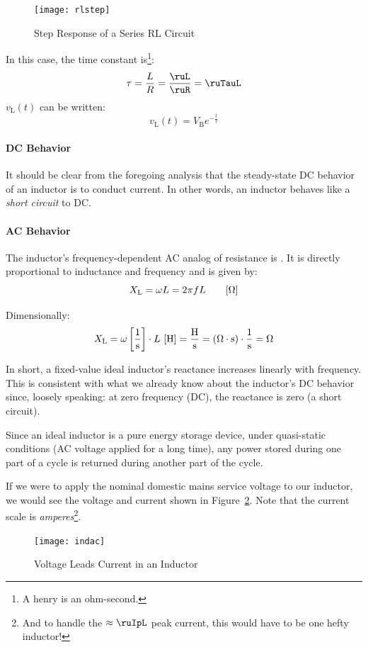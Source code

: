 \documentclass[11pt]{article}
\begin{document}
\begin{figure}[ht]
  \centering
  \texttt{[image: rlstep]}
  \caption{Step Response of a Series RL Circuit}
  \label{fig:rlstep}
\end{figure}

In this case, the time constant is\footnote{A henry is an ohm-second.}:
\[
\tau = \frac{L}{R} = \frac{\ruL}{\ruR} = \ruTauL
\]
$v_\mathrm{L}(t)$ can be written:
\[
v_\mathrm{L}(t) = V_\mathrm{B}e^{-\frac{t}{\tau}}
\]


\paragraph{DC Behavior}

It should be clear from the foregoing analysis that the steady-state
DC behavior of an inductor is to conduct current. In other words, an
inductor behaves like a \emph{short circuit} to DC.


\paragraph{AC Behavior}

The inductor's frequency-dependent AC analog of resistance is
. It is directly proportional to inductance
and frequency and is given by:
\[
X_\mathrm{L} = \omega L = 2\pi f L\qquad\bunit{\Omega}
\]

Dimensionally:
\[
X_\mathrm{L} = \omega\bunit{1}{s}\cdot L~\bunit{H} = \unit{H}{s} = \left(\unit{\Omega\cdot s}\right)\cdot\unit{1}{s} = \unit{\Omega}
\]

In short, a fixed-value ideal inductor's reactance increases linearly
with frequency. This is consistent with what we already know about the
inductor's DC behavior since, loosely speaking: at zero frequency
(DC), the reactance is zero (a short circuit).

Since an ideal inductor is a pure energy storage device, under
quasi-static conditions (AC voltage applied for a long time), any
power stored during one part of a cycle is returned during another
part of the cycle.

If we were to apply the nominal domestic mains service voltage to our
\ruL inductor, we would see the voltage and current shown in
Figure~\ref{fig:indac}. Note that the current scale is
\emph{amperes}\footnote{And to handle the $\approx\ruIpL$ peak
  current, this would have to be one hefty inductor!}.

\begin{figure}
  \centering
  \texttt{[image: indac]}
  \caption{Voltage Leads Current in an Inductor}
  \label{fig:indac}
\end{figure}
\end{document}
